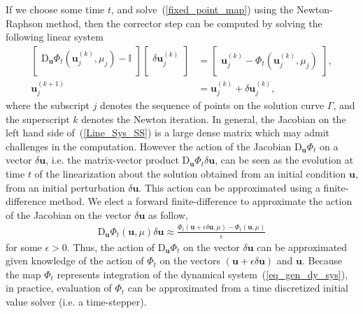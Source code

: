 If we choose some time $t$, and solve~(\ref{fixed_point_map}) using the Newton-Raphson method, then the corrector step can be computed by solving the following linear system
\begin{subequations}
\begin{align}
\label{Line_Sys_SS}
\begin{bmatrix}
\textrm{D}_{\mathbf{u}} \Phi_t(\mathbf{u}_{j}^{(k)},\mu_j) - \mathbb{I} \\
\end{bmatrix}
\begin{bmatrix}
\delta \textbf{u}_j^{(k)}\\
\end{bmatrix}
&=
\begin{bmatrix}
\mathbf{u}_{j}^{(k)}-\Phi_t(\mathbf{u}_j^{(k)},\mu_{j})
\end{bmatrix},\\
\mathbf{u}_{j}^{(k+1)} &= \mathbf{u}_{j}^{(k)} + \delta\mathbf{u}_{j}^{(k)},
\end{align}
\end{subequations}
where the subscript $j$ denotes the sequence of points on the solution curve $\Gamma$, and the superscript $k$ denotes the
Newton iteration. In general, the Jacobian on the left hand side of~(\ref{Line_Sys_SS}) is a large dense matrix which may admit challenges in the computation.
However the action of the Jacobian $\textrm{D}_{\mathbf{u}}\Phi_t$ on a vector $\delta \mathbf{u}$, i.e. the matrix-vector product $\textrm{D}_{\mathbf{u}} \Phi_t\delta\mathbf{u}$,  can be seen as the evolution at time $t$ of the linearization about the solution obtained from an initial condition $\mathbf{u}$, from an initial perturbation $\delta\mathbf{u}$. This action can be approximated using a finite-difference method. We elect a forward finite-difference to approximate the action of the Jacobian on the vector $\delta\mathbf{u}$ as follow,
\begin{align}
\label{for_fin_diff}
\mathrm{D}_{\mathbf{u}}\Phi_t(\mathbf{u},\mu)\delta\mathbf{u} \approx \frac{\Phi_t(\mathbf{u}+ \epsilon\delta\mathbf{u},\mu)-\Phi_t(\mathbf{u},\mu)}{\epsilon}
\end{align}
for some $\epsilon > 0$. Thus, the action of $\mathrm{D}_{\mathbf{u}}\Phi_t$ on the vector $\delta\mathbf{u}$ can be approximated given knowledge of the action of $\Phi_t$ on the vectors $(\mathbf{u}+\epsilon\delta\mathbf{u})$ and $\mathbf{u}$. Because the map $\Phi_t$ represents integration of the dynamical system~(\ref{eq_gen_dy_sys}), in practice, evaluation of $\Phi_t$ can be approximated from a time discretized initial value solver (i.e. a time-stepper).

